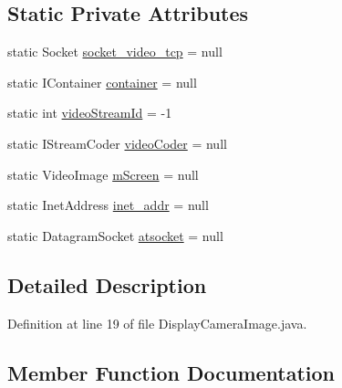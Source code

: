 \subsection*{Static Private Attributes}
\begin{DoxyCompactItemize}
\item 
static Socket \hyperlink{classworkspace_1_1_a_r_drone_capture_image_1_1src_1_1_display_camera_image_a03bb3aa316596a78abdb6f7d6a7c14f8}{socket\+\_\+video\+\_\+tcp} = null
\item 
static I\+Container \hyperlink{classworkspace_1_1_a_r_drone_capture_image_1_1src_1_1_display_camera_image_ad5078e38667c841c5c1d4541741fe5a9}{container} = null
\item 
static int \hyperlink{classworkspace_1_1_a_r_drone_capture_image_1_1src_1_1_display_camera_image_aa2f5d378f7aa31734eb27fc38ed672f6}{video\+Stream\+Id} = -\/1
\item 
static I\+Stream\+Coder \hyperlink{classworkspace_1_1_a_r_drone_capture_image_1_1src_1_1_display_camera_image_a13aa4bcc23766e6bac7e49ea7c882019}{video\+Coder} = null
\item 
static Video\+Image \hyperlink{classworkspace_1_1_a_r_drone_capture_image_1_1src_1_1_display_camera_image_a0cef26d99006f123fc8ff67021768909}{m\+Screen} = null
\item 
static Inet\+Address \hyperlink{classworkspace_1_1_a_r_drone_capture_image_1_1src_1_1_display_camera_image_ac7d1c7172e03fbfe7a47ec9ca3d2b87b}{inet\+\_\+addr} = null
\item 
static Datagram\+Socket \hyperlink{classworkspace_1_1_a_r_drone_capture_image_1_1src_1_1_display_camera_image_a51144603e1e729eb0bf4c781de6d2a13}{atsocket} = null
\end{DoxyCompactItemize}


\subsection{Detailed Description}


Definition at line 19 of file Display\+Camera\+Image.\+java.



\subsection{Member Function Documentation}
\hypertarget{classworkspace_1_1_a_r_drone_capture_image_1_1src_1_1_display_camera_image_ada98bede132289381d6895d2285c367f}{}
